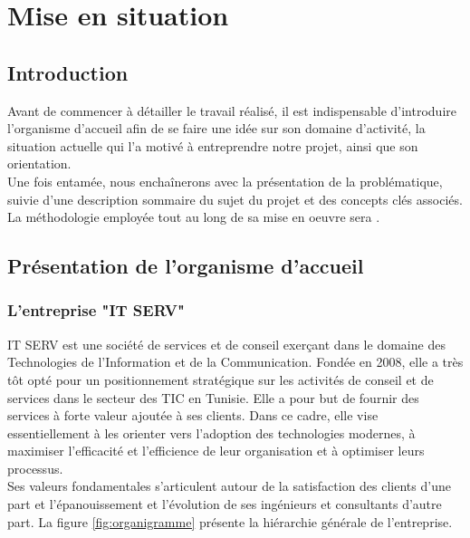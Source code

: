 
\setcounter{mtc}{1} %
\chapter{Mise en situation}
\minitoc  %

\graphicspath{{Chapitre1/figures/}}
\pagestyle{fancy}
\fancyhf{}
\fancyhead[R]{\bfseries\rightmark}
\fancyfoot[R]{\thepage}
\renewcommand{\headrulewidth}{0.5pt}
\renewcommand{\footrulewidth}{0pt}
\renewcommand{\chaptermark}[1]{\markboth{\MakeUppercase{\chaptername~\thechapter. #1 }}{}}
\renewcommand{\sectionmark}[1]{\markright{\thechapter.\thesection~ #1}}

\begin{spacing}{1.5}

\section*{Introduction}
Avant de commencer à détailler le travail réalisé, il est indispensable d'introduire l'organisme d'accueil afin de se faire une idée sur son domaine d'activité, la situation actuelle qui l'a motivé à entreprendre notre projet, ainsi que son orientation.\\
Une fois entamée, nous enchaînerons avec la présentation de la problématique, suivie d'une description sommaire du sujet du projet et des concepts clés associés.\\
La méthodologie employée tout au long de sa mise en oeuvre sera .


\section{Présentation de l'organisme d'accueil}
\subsection{L'entreprise "IT SERV"}
IT SERV est une société de services et de conseil exerçant dans le domaine des Technologies de l'Information et de la Communication.
Fondée en 2008, elle a très tôt opté pour un positionnement stratégique sur les activités de conseil et de services dans le secteur des TIC en Tunisie. Elle a pour but de fournir des services à forte valeur ajoutée à ses clients. Dans ce cadre, elle vise essentiellement à les orienter vers l'adoption des technologies modernes, à maximiser l'efficacité et l'efficience de leur organisation et à optimiser leurs processus.\\
Ses valeurs fondamentales s'articulent autour de la satisfaction des clients d'une part et l'épanouissement et l'évolution de ses ingénieurs et consultants d'autre part. La figure \ref{fig:organigramme} présente la hiérarchie générale de l'entreprise.\\


\end{spacing}
